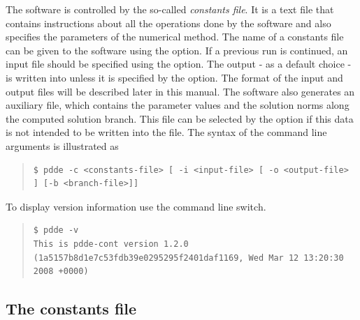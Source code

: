 \documentclass[10pt,a4paper]{ddedoc}
\begin{document}
The software is controlled by the so-called \emph{constants file}. It is a text file
that contains instructions about all the operations done by the software and
also specifies the parameters of the numerical method.
The name of a constants file can be given to the software using the  option.
If a previous run is continued, an input file should be specified using the  option. 
The output - as a default choice - is written into  unless it is specified
by the  option. The format of the input and output files will
be described later in this manual. The software also generates an auxiliary file,
which contains the parameter values and the solution norms along the computed
solution branch.
This file can be selected by the  option if this data is not intended
to be written into the  file. The syntax of the command line
arguments is illustrated as
{ \small \begin{quote} \begin{lstlisting}[basicstyle=\tt,frame=single]
$ pdde -c <constants-file> [ -i <input-file> [ -o <output-file> ] [-b <branch-file>]]
\end{lstlisting} \end{quote} } \noindent
To display version information use the  command line switch.
{ \small \begin{quote} \begin{lstlisting}[basicstyle=\tt,frame=single]
$ pdde -v
This is pdde-cont version 1.2.0 (1a5157b8d1e7c53fdb39e0295295f2401daf1169, Wed Mar 12 13:20:30 2008 +0000)
\end{lstlisting} \end{quote} } \noindent


\subsection{The constants file}
\label{constfile}
\end{document}
